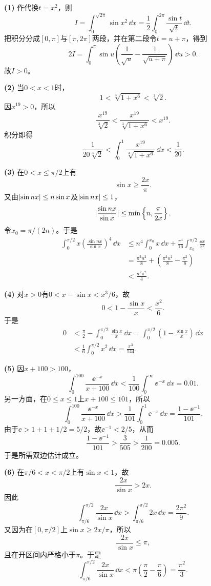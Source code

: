 \begin{xsolution}
\textbf{(1)}\quad
作代换$t=x^2$，则
\[
 I=\int_0^{\sqrt{2\pi}}\sin x^2\,\dd x
 =\frac12\int_0^{2\pi}\frac{\sin t}{\sqrt t}\,\dd t.
\]
把积分分成$[0,\pi]$与$[\pi,2\pi]$两段，并在第二段令$t=u+\pi$，得到
\[
 2I=\int_0^\pi\sin u\left(\frac1{\sqrt u}-\frac1{\sqrt{u+\pi}}\right)\,\dd u>0.
\]
故$I>0$。

\textbf{(2)}\quad
当$0<x<1$时，
\[
 1<\sqrt[3]{1+x^6}<\sqrt[3]2.
\]
因$x^{19}>0$，所以
\[
 \frac{x^{19}}{\sqrt[3]2}
 <\frac{x^{19}}{\sqrt[3]{1+x^6}}<x^{19}.
\]
积分即得
\[
 \frac1{20\sqrt[3]2}
 <\int_0^1\frac{x^{19}}{\sqrt[3]{1+x^6}}\,\dd x
 <\frac1{20}.
\]

\textbf{(3)}\quad
在$0<x\le\pi/2$上有
\[
 \sin x\ge\frac{2x}{\pi}.
\]
又由$\lvert\sin nx\rvert\le n\sin x$及$\lvert\sin nx\rvert\le1$，
\[
 \lvert\frac{\sin nx}{\sin x}\rvert
 \le\min\left\{n,\frac\pi{2x}\right\}.
\]
令$x_0=\pi/(2n)$。于是
\begin{align*}
\int_0^{\pi/2}x\left(\frac{\sin nx}{\sin x}\right)^4\,\dd x
&\le n^4\int_0^{x_0}x\,\dd x
 +\frac{\pi^4}{16}\int_{x_0}^{\pi/2}\frac{\dd x}{x^3}\\
&=\frac{\pi^2n^2}{8}+\left(\frac{\pi^2n^2}{8}-\frac{\pi^2}{8}\right)\\
&<\frac{n^2\pi^2}{4}.
\end{align*}

\textbf{(4)}\quad
对$x>0$有$0<x-\sin x<x^3/6$，故
\[
 0<1-\frac{\sin x}{x}<\frac{x^2}{6}.
\]
于是
\begin{align*}
0&<\frac\pi2-\int_0^{\pi/2}\frac{\sin x}{x}\,\dd x
 =\int_0^{\pi/2}\left(1-\frac{\sin x}{x}\right)\,\dd x\\
&<\frac16\int_0^{\pi/2}x^2\,\dd x
 =\frac{\pi^3}{144}.
\end{align*}

\textbf{(5)}\quad
因$x+100>100$，
\[
 \int_0^{100}\frac{\ee^{-x}}{x+100}\,\dd x
 <\frac1{100}\int_0^{\infty}\ee^{-x}\,\dd x=0.01.
\]
另一方面，在$0\le x\le1$上$x+100\le101$，所以
\[
 \int_0^{100}\frac{\ee^{-x}}{x+100}\,\dd x
 >\frac1{101}\int_0^1\ee^{-x}\,\dd x
 =\frac{1-\ee^{-1}}{101}.
\]
由于$\ee>1+1+1/2=5/2$，故$\ee^{-1}<2/5$，从而
\[
 \frac{1-\ee^{-1}}{101}>\frac{3}{505}>\frac1{200}=0.005.
\]
于是所需双边估计成立。

\textbf{(6)}\quad
在$\pi/6<x<\pi/2$上有$\sin x<1$，故
\[
 \frac{2x}{\sin x}>2x.
\]
因此
\[
 \int_{\pi/6}^{\pi/2}\frac{2x}{\sin x}\,\dd x
 >\int_{\pi/6}^{\pi/2}2x\,\dd x
 =\frac{2\pi^2}{9}.
\]
又因为在$[0,\pi/2]$上$\sin x\ge2x/\pi$，所以
\[
 \frac{2x}{\sin x}\le\pi,
\]
且在开区间内严格小于$\pi$。于是
\[
 \int_{\pi/6}^{\pi/2}\frac{2x}{\sin x}\,\dd x
 <\pi\left(\frac\pi2-\frac\pi6\right)
 =\frac{\pi^2}{3}.
\]
\end{xsolution}


